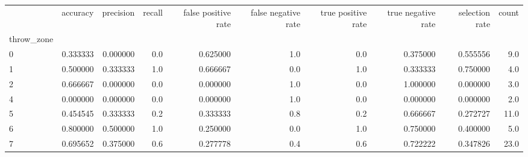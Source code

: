 \begin{tabular}{lrrrrrrrrr}
\toprule
{} &  accuracy &  precision &  recall &  false positive rate &  false negative rate &  true positive rate &  true negative rate &  selection rate &  count \\
throw\_zone &           &            &         &                      &                      &                     &                     &                 &        \\
\midrule
0          &  0.333333 &   0.000000 &     0.0 &             0.625000 &                  1.0 &                 0.0 &            0.375000 &        0.555556 &    9.0 \\
1          &  0.500000 &   0.333333 &     1.0 &             0.666667 &                  0.0 &                 1.0 &            0.333333 &        0.750000 &    4.0 \\
2          &  0.666667 &   0.000000 &     0.0 &             0.000000 &                  1.0 &                 0.0 &            1.000000 &        0.000000 &    3.0 \\
4          &  0.000000 &   0.000000 &     0.0 &             0.000000 &                  1.0 &                 0.0 &            0.000000 &        0.000000 &    2.0 \\
5          &  0.454545 &   0.333333 &     0.2 &             0.333333 &                  0.8 &                 0.2 &            0.666667 &        0.272727 &   11.0 \\
6          &  0.800000 &   0.500000 &     1.0 &             0.250000 &                  0.0 &                 1.0 &            0.750000 &        0.400000 &    5.0 \\
7          &  0.695652 &   0.375000 &     0.6 &             0.277778 &                  0.4 &                 0.6 &            0.722222 &        0.347826 &   23.0 \\
\bottomrule
\end{tabular}
